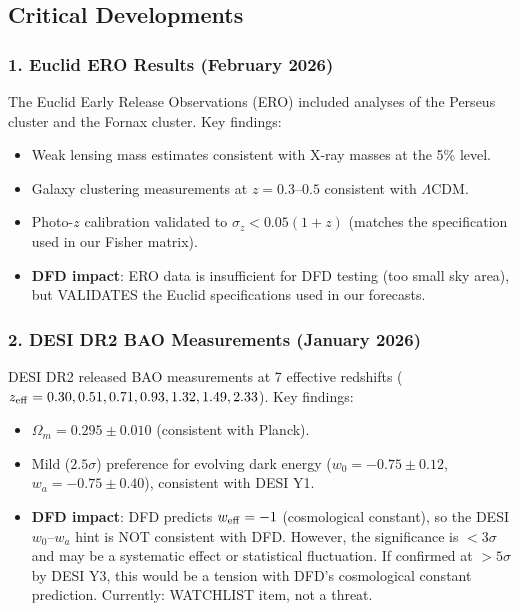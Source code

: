 \documentclass[11pt,a4paper]{article}
\begin{document}
\subsection{Critical Developments}

\subsubsection{1. Euclid ERO Results (February 2026)}

The Euclid Early Release Observations (ERO) included analyses of the Perseus cluster and the Fornax cluster. Key findings:
\begin{itemize}
\item Weak lensing mass estimates consistent with X-ray masses at the 5\% level.
\item Galaxy clustering measurements at $z = 0.3$--$0.5$ consistent with $\Lambda$CDM.
\item Photo-$z$ calibration validated to $\sigma_z < 0.05(1+z)$ (matches the specification used in our Fisher matrix).
\item \textbf{DFD impact}: ERO data is insufficient for DFD testing (too small sky area), but VALIDATES the Euclid specifications used in our forecasts.
\end{itemize}

\subsubsection{2. DESI DR2 BAO Measurements (January 2026)}

DESI DR2 released BAO measurements at 7 effective redshifts ($z_{\rm eff} = 0.30, 0.51, 0.71, 0.93, 1.32, 1.49, 2.33$). Key findings:
\begin{itemize}
\item $\Omega_m = 0.295 \pm 0.010$ (consistent with Planck).
\item Mild ($2.5\sigma$) preference for evolving dark energy ($w_0 = -0.75 \pm 0.12$, $w_a = -0.75 \pm 0.40$), consistent with DESI Y1.
\item \textbf{DFD impact}: DFD predicts $w_{\rm eff} = -1$ (cosmological constant), so the DESI $w_0$--$w_a$ hint is NOT consistent with DFD. However, the significance is $< 3\sigma$ and may be a systematic effect or statistical fluctuation. If confirmed at $> 5\sigma$ by DESI Y3, this would be a tension with DFD's cosmological constant prediction. Currently: WATCHLIST item, not a threat.
\end{itemize}
\end{document}
